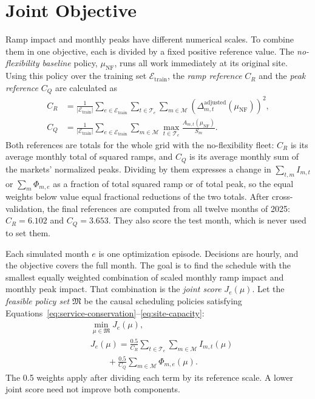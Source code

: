 \documentclass{UNCC-thesis}
\begin{document}
\section{Joint Objective}
\label{subsec:problem-normalization}

Ramp impact and monthly peaks have different numerical scales. To combine
them in one objective, each is divided by a fixed positive reference value.
The \emph{no-flexibility baseline} policy,
\(\mu_{\mathrm{NF}}\), runs all work immediately at its original site.
Using this policy over the training set \(\mathcal E_{\mathrm{train}}\), the
\emph{ramp reference} \(C_R\) and the \emph{peak reference} \(C_Q\) are
calculated as
\begin{align}
  C_R
  &=
  \frac{1}{|\mathcal E_{\mathrm{train}}|}
  \sum_{e\in\mathcal E_{\mathrm{train}}}
  \sum_{t\in\mathcal T_e}\sum_{m\in\mathcal M}
  \left(\Delta^{\mathrm{adjusted}}_{m,t}(\mu_{\mathrm{NF}})\right)^2,
  \label{eq:ramp-reference}\\
  C_Q
  &=
  \frac{1}{|\mathcal E_{\mathrm{train}}|}
  \sum_{e\in\mathcal E_{\mathrm{train}}}\sum_{m\in\mathcal M}
  \max_{t\in\mathcal T_e}\frac{A_{m,t}(\mu_{\mathrm{NF}})}{S_m}.
  \label{eq:peak-reference}
\end{align}
Both references are totals for the whole grid with the no-flexibility fleet:
\(C_R\) is its average monthly total of squared ramps, and \(C_Q\) is its
average monthly sum of the markets' normalized peaks. Dividing by them expresses
a change in \(\sum_{t,m}I_{m,t}\) or \(\sum_m\Phi_{m,e}\) as a fraction of total
squared ramp or of total peak, so the equal weights below value equal
fractional reductions of the two totals.  After cross-validation, the final references are computed from all twelve months of 2025: \(C_R=6.102\) and
\(C_Q=3.653\). They also score the test month, which is never used to set
them. 

Each simulated month \(e\) is one optimization episode. Decisions are hourly,
and the objective covers the full month. The goal is to find the schedule
with the smallest equally weighted combination of scaled monthly ramp impact
and monthly peak impact. That combination is the \emph{joint
score} \(J_e(\mu)\). Let the \emph{feasible policy set} \(\mathfrak M\) be the
causal scheduling policies satisfying
Equations~\eqref{eq:service-conservation}--\eqref{eq:site-capacity}:
\begin{equation}
  \begin{aligned}
    &\min_{\mu\in\mathfrak M} J_e(\mu),\\
    &J_e(\mu)
    =
    \frac{0.5}{C_R}
    \sum_{t\in\mathcal T_e}\sum_{m\in\mathcal M} I_{m,t}(\mu)\\
    &\hspace{2em}
    +\frac{0.5}{C_Q}
    \sum_{m\in\mathcal M} \Phi_{m,e}(\mu).
  \end{aligned}
  \label{eq:objective}
\end{equation}
The 0.5 weights apply after dividing each term by its reference scale.
A lower joint score need not improve both components.
\end{document}
